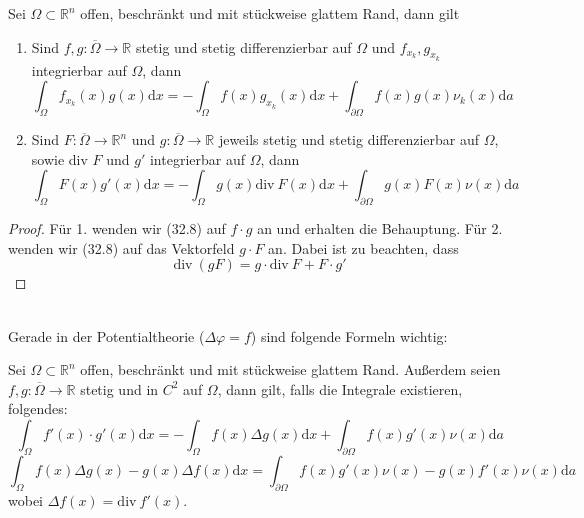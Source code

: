\begin{theorem}
Sei $\Omega\subset\mathbb{R}^n$ offen, beschränkt und mit 
stückweise glattem Rand, dann gilt
\begin{enumerate}
	\item 	Sind $f,g:\overline{\Omega}\rightarrow\mathbb{R}$ 
			stetig und stetig differenzierbar auf 
			$\Omega$ und $f_{x_k},g_{x_k}$ integrierbar auf 
			$\Omega$, dann 
			\begin{equation}
				\int_\Omega f_{x_k}(x)g(x)\mathrm{d}x = 
				- \int_\Omega f(x)g_{x_k}(x)\mathrm{d}x + 
				\int_{\partial\Omega}f(x)g(x)\nu_k(x)\mathrm{d}a
			\end{equation}
	\item Sind $F:\overline{\Omega}\rightarrow\mathbb{R}^n$ 
			und $g:\overline{\Omega}\rightarrow\mathbb{R}$ 
			jeweils stetig und stetig differenzierbar auf 
			$\Omega$, sowie div $F$ und $g'$ integrierbar 
			auf $\Omega$, dann
			\begin{equation}
				\int_\Omega F(x)g'(x)\mathrm{d}x = 
				-\int_\Omega g(x)\mathrm{div\ }F(x)\mathrm{d}x + 
				\int_{\partial\Omega}g(x)F(x)\nu(x)\mathrm{d}a
			\end{equation}
\end{enumerate}
\end{theorem}

\begin{proof}
Für 1. wenden wir (32.8) auf $f\cdot g$ an und erhalten die 
Behauptung. Für 2. wenden wir (32.8) auf das Vektorfeld 
$g\cdot F$ an. Dabei ist zu beachten, dass
\begin{equation*}
	\mathrm{div\ }(gF)=g\cdot\mathrm{div\ }F + F\cdot g'
\end{equation*}
\end{proof}
\ \\
Gerade in der Potentialtheorie ($\Delta\varphi=f$) sind folgende 
Formeln wichtig:

\begin{satz}
Sei $\Omega\subset\mathbb{R}^n$ offen, beschränkt und mit 
stückweise glattem Rand. Außerdem seien $f,g:\overline{\Omega} 
\rightarrow\mathbb{R}$ stetig und in $C^2$ auf $\Omega$, 
dann gilt, falls die Integrale existieren, folgendes:
\begin{equation}
	\int_\Omega f'(x)\cdot g'(x)\mathrm{d}x = 
	-\int_\Omega f(x)\Delta g(x)\mathrm{d}x + 
	\int_{\partial\Omega}f(x)g'(x)\nu(x)\mathrm{d}a
\end{equation}
\begin{equation}
	\int_{\Omega}f(x)\Delta g(x)-g(x)\Delta f(x)\mathrm{d}x = 
	\int_{\partial\Omega}f(x)g'(x)\nu(x) - 
	g(x)f'(x)\nu(x)\mathrm{d}a 
\end{equation}
wobei $\Delta f(x)=\mathrm{div\ }f'(x)$.
\end{satz}

